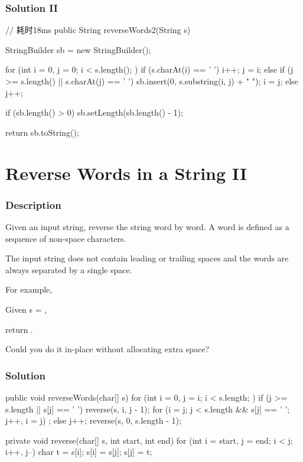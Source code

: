\newpage

\subsubsection{Solution II}

\begin{Code}
// 耗时18ms
public String reverseWords2(String s) {
    StringBuilder sb = new StringBuilder();

    for (int i = 0, j = 0; i < s.length(); ) {
        if (s.charAt(i) == ' ') {
            i++;
            j = i;
        } else if (j >= s.length() || s.charAt(j) == ' ') {
            sb.insert(0, s.substring(i, j) + " ");
            i = j;
        } else {
            j++;
        }
    }

    if (sb.length() > 0) {
        sb.setLength(sb.length() - 1);
    }

    return sb.toString();
}
\end{Code}

\newpage

\section{Reverse Words in a String II} %

\subsubsection{Description}
Given an input string, reverse the string word by word. A word is defined as a sequence of non-space characters.

The input string does not contain leading or trailing spaces and the words are always separated by a single space.

For example,

Given s = ,

return .

Could you do it in-place without allocating extra space?
\subsubsection{Solution}

\begin{Code}
public void reverseWords(char[] s) {
    for (int i = 0, j = i; i < s.length; ) {
        if (j >= s.length || s[j] == ' ') {
            reverse(s, i, j - 1);
            for (i = j; j < s.length && s[j] == ' '; j++, i = j) ;
        } else {
            j++;
        }
    }
    reverse(s, 0, s.length - 1);
}

private void reverse(char[] s, int start, int end) {
    for (int i = start, j = end; i < j; i++, j--) {
        char t = s[i];
        s[i] = s[j];
        s[j] = t;
    }
}
\end{Code}

